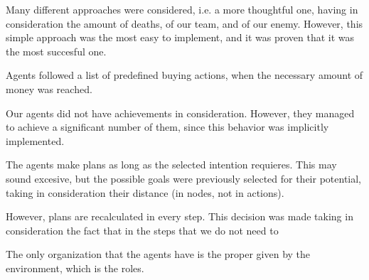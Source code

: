 \documentclass{llncs2e/llncs}
\begin{document}
    Many different approaches were considered, i.e. a more thoughtful one, having 
    in consideration the amount of deaths, of our team, and of our enemy. However,
    this simple approach was the most easy to implement, and it was proven that it
    was the most succesful one.

    Agents followed a list of predefined buying actions, when the necessary amount 
    of money was reached.

    Our agents did not have achievements in consideration. However, they managed 
    to achieve a significant number of them, since this behavior was implicitly 
    implemented.

    The agents make plans as long as the selected intention requieres. This may 
    sound excesive, but the possible goals were previously selected for their 
    potential, taking in consideration their distance (in nodes, not in actions).

    However, plans are recalculated in every step. This decision was made taking 
    in consideration the fact that in the steps that we do not need to 

    The only organization that the agents have is the proper given by the 
    environment, which is the roles. 
    
\end{document}
